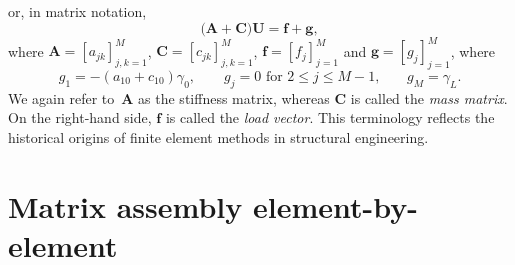 or, in matrix notation,
\begin{equation}\label{eq: self-adjoint mixed equations}
\bigl(\boldsymbol{A}+\boldsymbol{C}\bigr)\boldsymbol{U}
    =\boldsymbol{f}+\boldsymbol{g},
\end{equation}
where $\boldsymbol{A}=[a_{jk}]_{j,k=1}^M$, $\boldsymbol{C}=[c_{jk}]_{j,k=1}^M$,
$\boldsymbol{f}=[f_j]_{j=1}^M$ and $\boldsymbol{g}=[g_j]_{j=1}^M$, where
\[
g_1=-(a_{10}+c_{10})\gamma_0,\qquad
\text{$g_j=0$ for $2\le j\le M-1$,}\qquad
g_M=\gamma_L.
\]
We again refer to~$\boldsymbol{A}$ as the stiffness matrix, whereas 
$\boldsymbol{C}$ is called the \emph{mass matrix}.  On the right-hand side, 
$\boldsymbol{f}$ is called the \emph{load vector}.  This terminology reflects 
the historical origins of finite element methods in structural engineering.

\section{Matrix assembly element-by-element}

